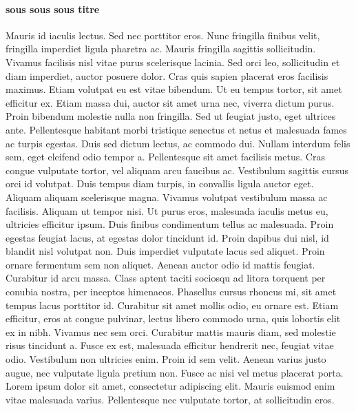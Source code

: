 \documentclass[twoside,a4paper]{article}
\begin{document}
\begin{triple}
\paragraph{sous sous sous titre}

Mauris id iaculis lectus. Sed nec porttitor eros. Nunc fringilla finibus velit, fringilla imperdiet ligula pharetra ac. Mauris fringilla sagittis sollicitudin. Vivamus facilisis nisl vitae purus scelerisque lacinia. Sed orci leo, sollicitudin et diam imperdiet, auctor posuere dolor. Cras quis sapien placerat eros facilisis maximus. Etiam volutpat eu est vitae bibendum. Ut eu tempus tortor, sit amet efficitur ex. Etiam massa dui, auctor sit amet urna nec, viverra dictum purus. Proin bibendum molestie nulla non fringilla. Sed ut feugiat justo, eget ultrices ante. Pellentesque habitant morbi tristique senectus et netus et malesuada fames ac turpis egestas.
Duis sed dictum lectus, ac commodo dui. Nullam interdum felis sem, eget eleifend odio tempor a. Pellentesque sit amet facilisis metus. Cras congue vulputate tortor, vel aliquam arcu faucibus ac. Vestibulum sagittis cursus orci id volutpat. Duis tempus diam turpis, in convallis ligula auctor eget. Aliquam aliquam scelerisque magna. Vivamus volutpat vestibulum massa ac facilisis. Aliquam ut tempor nisi. Ut purus eros, malesuada iaculis metus eu, ultricies efficitur ipsum. Duis finibus condimentum tellus ac malesuada.
Proin egestas feugiat lacus, at egestas dolor tincidunt id. Proin dapibus dui nisl, id blandit nisl volutpat non. Duis imperdiet vulputate lacus sed aliquet. Proin ornare fermentum sem non aliquet. Aenean auctor odio id mattis feugiat. Curabitur id arcu massa. Class aptent taciti sociosqu ad litora torquent per conubia nostra, per inceptos himenaeos. Phasellus cursus rhoncus mi, sit amet tempus lacus porttitor id. Curabitur sit amet mollis odio, eu ornare est. Etiam efficitur, eros at congue pulvinar, lectus libero commodo urna, quis lobortis elit ex in nibh. Vivamus nec sem orci.
Curabitur mattis mauris diam, sed molestie risus tincidunt a. Fusce ex est, malesuada efficitur hendrerit nec, feugiat vitae odio. Vestibulum non ultricies enim. Proin id sem velit. Aenean varius justo augue, nec vulputate ligula pretium non. Fusce ac nisi vel metus placerat porta. Lorem ipsum dolor sit amet, consectetur adipiscing elit. Mauris euismod enim vitae malesuada varius. Pellentesque nec vulputate tortor, at sollicitudin eros.
\end{triple}
\end{document}
